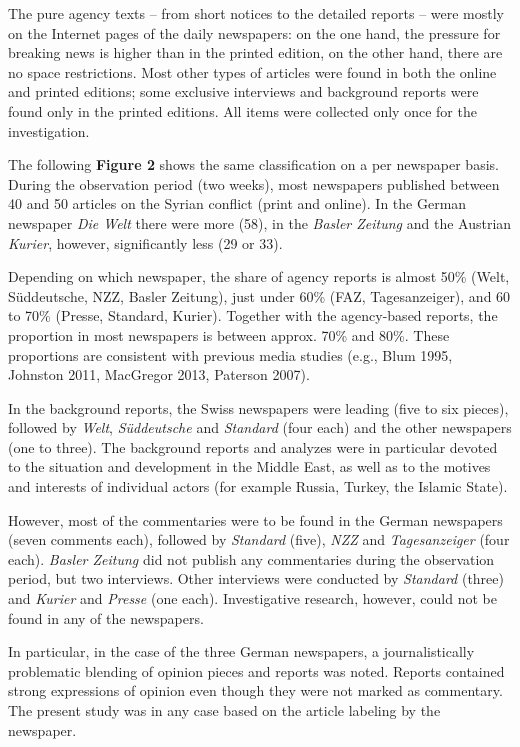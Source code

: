 The pure agency texts -- from short notices to the detailed reports --
were mostly on the Internet pages of the daily newspapers: on the one
hand, the pressure for breaking news is higher than in the printed
edition, on the other hand, there are no space restrictions. Most other
types of articles were found in both the online and printed editions;
some exclusive interviews and background reports were found only in the
printed editions. All items were collected only once for the
investigation.

The following \textbf{Figure 2} shows the same classification on a per
newspaper basis. During the observation period (two weeks), most
newspapers published between 40 and 50 articles on the Syrian conflict
(print and online). In the German newspaper \emph{Die Welt} there were
more (58), in the \emph{Basler Zeitung} and the Austrian \emph{Kurier},
however, significantly less (29 or 33).

Depending on which newspaper, the share of agency reports is almost 50\%
(Welt, Süddeutsche, NZZ, Basler Zeitung), just under 60\% (FAZ,
Tagesanzeiger), and 60 to 70\% (Presse, Standard, Kurier). Together with
the agency-based reports, the proportion in most newspapers is between
approx. 70\% and 80\%. These proportions are consistent with previous
media studies (e.g., Blum 1995, Johnston 2011, MacGregor 2013, Paterson
2007).

In the background reports, the Swiss newspapers were leading (five to
six pieces), followed by \emph{Welt}, \emph{Süddeutsche} and
\emph{Standard} (four each) and the other newspapers (one to three). The
background reports and analyzes were in particular devoted to the
situation and development in the Middle East, as well as to the motives
and interests of individual actors (for example Russia, Turkey, the
Islamic State).

However, most of the commentaries were to be found in the German
newspapers (seven comments each), followed by \emph{Standard} (five),
\emph{NZZ} and \emph{Tagesanzeiger} (four each). \emph{Basler Zeitung}
did not publish any commentaries during the observation period, but two
interviews. Other interviews were conducted by \emph{Standard} (three)
and \emph{Kurier} and \emph{Presse} (one each). Investigative research,
however, could not be found in any of the newspapers.

In particular, in the case of the three German newspapers, a
journalistically problematic blending of opinion pieces and reports was
noted. Reports contained strong expressions of opinion even though they
were not marked as commentary. The present study was in any case based
on the article labeling by the newspaper.

